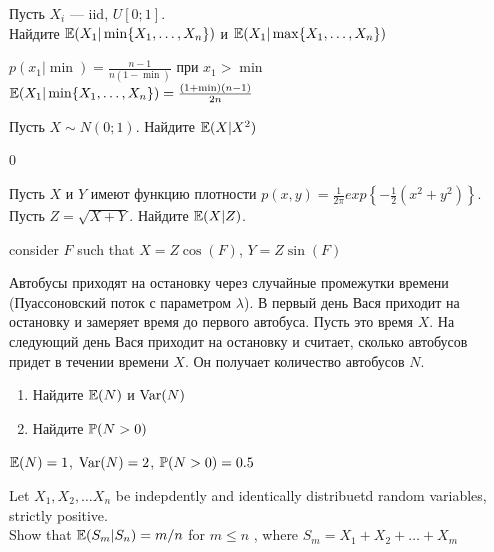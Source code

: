 \begin{problem}
Пусть $X_{i}$ — iid, $U[0;1]$. \\
Найдите $\E(X_{1}|\min\{X_{1},\ldots,X_{n}\})$ и
$\E(X_{1}|\max\{X_{1},\ldots,X_{n}\})$

\begin{sol}

$p(x_{1}|\min)=\frac{n-1}{n(1-\min)}$ при $x_{1}>\min$ \\
$\E(X_{1}|\min\{X_{1},\ldots,X_{n}\})=\frac{(1+\min)(n-1)}{2n}$
\end{sol}
\end{problem}

\begin{problem}
Пусть $X\sim N(0;1)$. Найдите $\E(X|X^{2})$

\begin{sol}
0
\end{sol}
\end{problem}

\begin{problem}
Пусть $X$ и $Y$ имеют функцию плотности
$p(x,y)=\frac{1}{2\pi}exp\left\{-\frac{1}{2}\left(x^{2}+y^{2}\right)\right\}$.\\
Пусть $Z=\sqrt{X+Y}$. Найдите $\E(X|Z)$.

\begin{sol}

 consider $F$ such that $X=Z\cos(F)$, $Y=Z\sin(F)$
\end{sol}
\end{problem}

\begin{problem}
Автобусы приходят на остановку через случайные промежутки времени (Пуассоновский поток с параметром $\lambda$). В первый день Вася приходит на остановку и замеряет время до первого автобуса. Пусть это время $X$. На следующий день Вася приходит на остановку и считает, сколько автобусов придет в течении времени $X$. Он получает количество автобусов $N$.
\begin{enumerate}
\item Найдите $\E(N)$ и $\Var(N)$
\item Найдите $\P(N>0)$
\end{enumerate}


\begin{sol}
$\E(N)=1$, $\Var(N)=2$, $\P(N>0)=0.5$
\end{sol}
\end{problem}

\begin{problem}
Let $X_1, X_2, \ldots X_n$ be indepdently and identically distribuetd random variables, strictly positive. \\
Show that $\E(S_{m}|S_{n})= m/n$ for $m\le n$ , where $S_{m} = X_{1} + X_{2} + \ldots + X_{m}$

\begin{sol}

\end{sol}
\end{problem}

